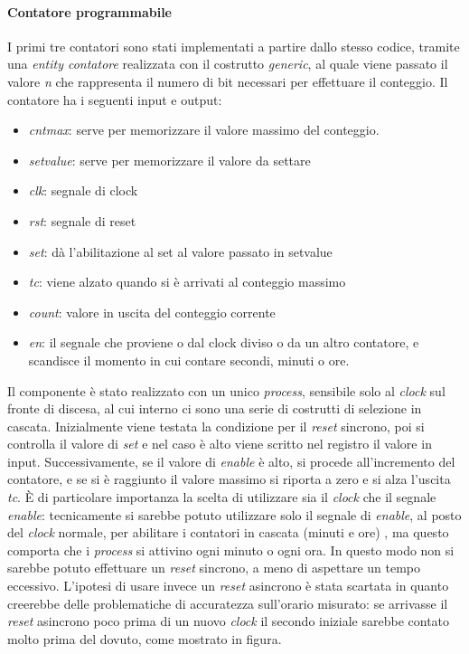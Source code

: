 \paragraph{Contatore programmabile}
I primi tre contatori sono stati implementati a partire dallo stesso codice, tramite una \textit{entity contatore} realizzata con il costrutto \textit{generic}, al quale viene passato il valore \textit{n} che rappresenta il numero di bit necessari per effettuare il conteggio. 
Il contatore ha i seguenti input e output:
\begin{itemize}
\item \textit{cntmax}: serve per memorizzare il valore massimo del conteggio.
\item \textit{setvalue}: serve per memorizzare il valore da settare
\item \textit{clk}: segnale di clock
\item \textit{rst}: segnale di reset
\item \textit{set}: dà l’abilitazione al set al valore passato in setvalue
\item \textit{tc}: viene alzato quando si è arrivati al conteggio massimo
\item \textit{count}: valore  in uscita del conteggio corrente
\item \textit{en}: il segnale che proviene o dal clock diviso o da un altro contatore, e scandisce il momento in cui contare secondi, minuti o ore.
\end{itemize}
Il componente è stato realizzato con un unico \textit{process}, sensibile solo al \textit{clock} sul fronte di discesa, al cui interno ci sono una serie di costrutti di selezione in cascata. Inizialmente viene testata la condizione per il \textit{reset} sincrono, poi si controlla il valore di \textit{set} e nel caso è alto viene scritto nel registro il valore in input. Successivamente, se il valore di \textit{enable} è alto, si procede all'incremento del contatore,  e se si è raggiunto il valore massimo si riporta a zero e si alza l'uscita \textit{tc}. È di particolare importanza la scelta di utilizzare sia il \textit{clock} che il segnale \textit{enable}: tecnicamente si sarebbe potuto utilizzare solo il segnale di \textit{enable}, al posto del \textit{clock} normale, per abilitare i contatori in cascata (minuti e ore) , ma questo comporta che i \textit{process} si attivino ogni minuto o ogni ora. In questo modo non si sarebbe potuto  effettuare un \textit{reset} sincrono, a meno di aspettare un tempo eccessivo. L'ipotesi di usare invece un \textit{reset} asincrono è stata scartata in quanto creerebbe delle problematiche di accuratezza sull'orario misurato: se arrivasse il \textit{reset} asincrono poco prima di un nuovo \textit{clock} il secondo iniziale sarebbe contato molto prima del dovuto, come mostrato in figura.

